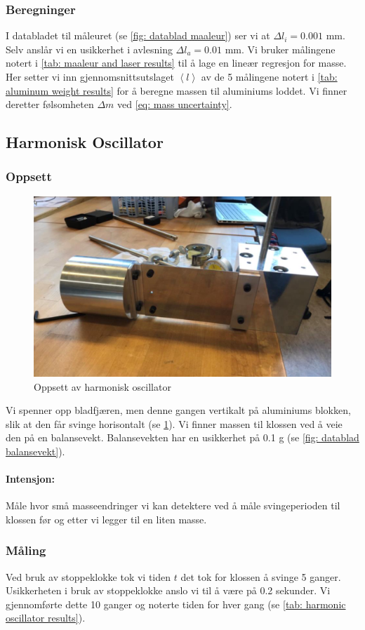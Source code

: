 \documentclass[reprint,norsk,notitlepage]{revtex4-2}
\begin{document}
\subsubsection{Beregninger} \label{ssec: calculations maaleur}
I databladet til måleuret (se \cref{fig: datablad maaleur}) ser vi at $Δl_i = 0.001$ mm. Selv anslår vi en usikkerhet i avlesning $Δl_a = 0.01$ mm. Vi bruker målingene notert i \cref{tab: maaleur and laser results} til å lage en lineær regresjon for masse. Her setter vi inn gjennomsnittsutslaget $\left<l\right>$ av de 5 målingene notert i \cref{tab: aluminum weight results} for å beregne massen til aluminiums loddet. Vi finner deretter følsomheten $Δm$ ved \cref{eq: mass uncertainty}.

\subsection{Harmonisk Oscillator}
\subsubsection{Oppsett}
\begin{figure}[h!]
  \centering
  \includegraphics[width = .4\textwidth]{fig/oscillator_oppsett.png}
  \caption{Oppsett av harmonisk oscillator}
  \label{fig: oppsett oscillator}
\end{figure}

Vi spenner opp bladfjæren, men denne gangen vertikalt på aluminiums blokken, slik at den får svinge horisontalt (se \cref{fig: oppsett oscillator}). Vi finner massen til klossen ved å veie den på en balansevekt. Balansevekten har en usikkerhet på 0.1 g (se \cref{fig: datablad balansevekt}).
\paragraph{\bf Intensjon:} Måle hvor små masseendringer vi kan detektere ved å måle svingeperioden til klossen før og etter vi legger til en liten masse.  

\subsubsection{Måling}
Ved bruk av stoppeklokke tok vi tiden $t$ det tok for klossen å svinge 5 ganger. Usikkerheten i bruk av stoppeklokke anslo vi til å være på 0.2 sekunder. Vi gjennomførte dette 10 ganger og noterte tiden for hver gang (se \cref{tab: harmonic oscillator results}). 
\end{document}

